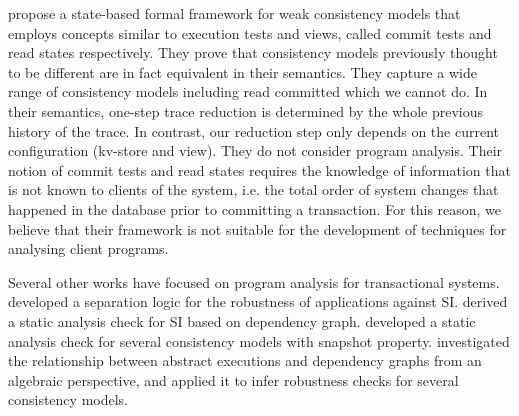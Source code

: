 \citet{seebelieve} propose a state-based formal framework for weak
consistency models 
that employs concepts  similar to execution tests and views, called commit tests and read states 
respectively.
They prove that consistency models previously thought to be different 
are in fact equivalent in their semantics.
They capture 
a wide range of consistency models including read committed which we cannot do. 
In their semantics, one-step trace reduction is determined by the whole previous history of the trace. 
In contrast, our reduction step only depends on the current configuration (kv-store and view).
They do not consider program analysis. Their notion of commit tests and read states requires 
the knowledge of information that is not known to clients of the system, i.e. the total order of system changes that happened in the database 
prior to committing a transaction. For this reason, we believe that
their framework is not suitable for the development of techniques for
analysing client programs. 

Several other works have focused on program analysis for transactional systems. 
\citet{dias-tm} developed a separation logic for
the robustness of applications against SI. \citet{fekete-tods} derived 
a static analysis check for SI based on dependency graph. \citet{giovanni_concur16}
developed a static analysis check for several consistency models with snapshot property. 
\citet{laws} investigated the relationship between abstract 
executions and dependency graphs from an algebraic perspective, and applied it to infer 
robustness checks for several consistency models. 

